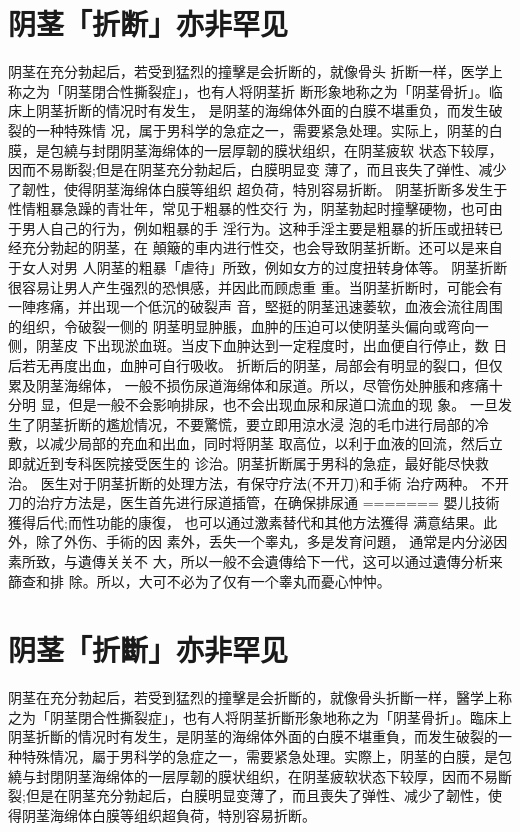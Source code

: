 \documentclass[12pt,UTF8]{ctexbook}
\begin{document}
\section{阴茎「折断」亦非罕见}
阴茎在充分勃起后，若受到猛烈的撞擊是会折断的，就像骨头
折断一样，医学上称之为「阴茎閉合性撕裂症」，也有人将阴茎折
断形象地称之为「阴茎骨折」。临床上阴茎折断的情况时有发生，
是阴茎的海绵体外面的白膜不堪重负，而发生破裂的一种特殊情
况，属于男科学的急症之一，需要紧急处理。实际上，阴茎的白
膜，是包繞与封閉阴茎海绵体的一层厚韌的膜状组织，在阴茎疲软
状态下较厚，因而不易断裂;但是在阴茎充分勃起后，白膜明显变
薄了，而且丧失了弹性、减少了韌性，使得阴茎海绵体白膜等组织
超负荷，特別容易折断。
阴茎折断多发生于性情粗暴急躁的青壮年，常见于粗暴的性交行
为，阴茎勃起时撞擊硬物，也可由于男人自己的行为，例如粗暴的手
淫行为。这种手淫主要是粗暴的折压或扭转已经充分勃起的阴茎，在
顛簸的車内进行性交，也会导致阴茎折断。还可以是来自于女人对男
人阴茎的粗暴「虐待」所致，例如女方的过度扭转身体等。
阴茎折断很容易让男人产生强烈的恐惧感，并因此而顾虑重
重。当阴茎折断时，可能会有一陣疼痛，并出现一个低沉的破裂声
音，堅挺的阴茎迅速萎软，血液会流往周围的组织，令破裂一侧的
阴茎明显肿脹，血肿的压迫可以使阴茎头偏向或弯向一侧，阴茎皮
下出现淤血斑。当皮下血肿达到一定程度时，出血便自行停止，数
日后若无再度出血，血肿可自行吸收。
折断后的阴茎，局部会有明显的裂口，但仅累及阴茎海绵体，
一般不损伤尿道海绵体和尿道。所以，尽管伤处肿脹和疼痛十分明
显，但是一般不会影响排尿，也不会出现血尿和尿道口流血的现
象。
一旦发生了阴茎折断的尷尬情况，不要驚慌，要立即用涼水浸
泡的毛巾进行局部的冷敷，以减少局部的充血和出血，同时将阴茎
取高位，以利于血液的回流，然后立即就近到专科医院接受医生的
诊治。阴茎折断属于男科的急症，最好能尽快救治。
医生对于阴茎折断的处理方法，有保守疗法(不开刀)和手術
治疗两种。
不开刀的治疗方法是，医生首先进行尿道插管，在确保排尿通
=======
嬰儿技術獲得后代;而性功能的康復，
也可以通过激素替代和其他方法獲得
满意结果。此外，除了外伤、手術的因
素外，丢失一个睾丸，多是发育问題，
通常是内分泌因素所致，与遺傳关关不
大，所以一般不会遺傳给下一代，这可以通过遺傳分析来篩查和排
除。所以，大可不必为了仅有一个睾丸而憂心忡忡。

\section{阴茎「折斷」亦非罕见}

阴茎在充分勃起后，若受到猛烈的撞擊是会折斷的，就像骨头折斷一样，醫学上称之为「阴茎閉合性撕裂症」，也有人将阴茎折斷形象地称之为「阴茎骨折」。臨床上阴茎折斷的情况时有发生，是阴茎的海绵体外面的白膜不堪重負，而发生破裂的一种特殊情况，屬于男科学的急症之一，需要紧急处理。实際上，阴茎的白膜，是包繞与封閉阴茎海绵体的一层厚韌的膜状组织，在阴茎疲软状态下较厚，因而不易斷裂;但是在阴茎充分勃起后，白膜明显变薄了，而且喪失了弹性、减少了韌性，使得阴茎海绵体白膜等组织超負荷，特別容易折断。
\end{document}
